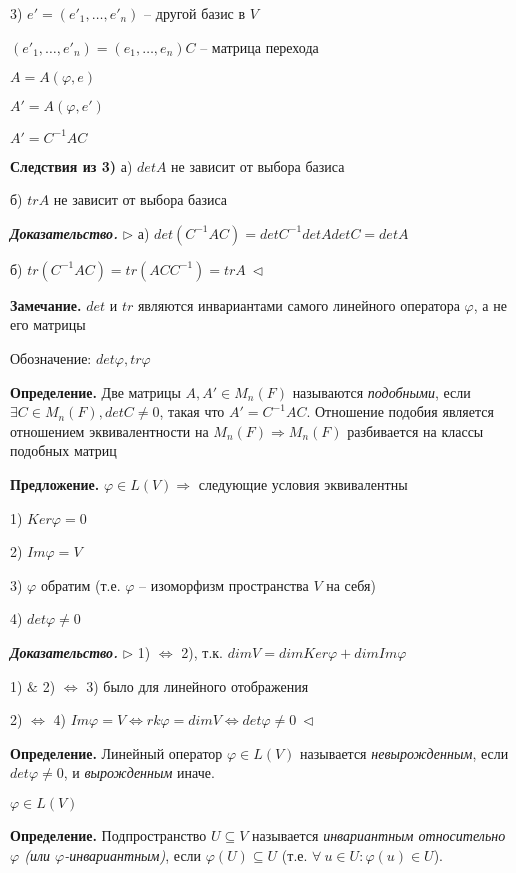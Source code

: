 3) $e' = (e'_1, \dots, e'_n)$ -- другой базис в $V$

$(e'_1, \dots, e'_n) = (e_1, \dots, e_n) C$ -- матрица перехода

$A = A(\varphi, e)$

$A' = A(\varphi, e')$

$A' = C^{-1}AC$

\bigskip
\textbf{Следствия из 3)} а) $det A$ не зависит от выбора базиса

б) $tr A$ не зависит от выбора базиса

\bigskip
\textbf{\textit{Доказательство.}} $\rhd$ а) $det (C^{-1} A C) = det C^{-1} det A det C = det A$

б) $tr(C^{-1} AC) = tr (AC C^{-1}) = tr A \ \lhd$

\bigskip
\textbf{Замечание.} $det$ и $tr$ являются инвариантами самого линейного оператора $\varphi$, а не его матрицы

Обозначение: $det \varphi, tr \varphi$

\bigskip
\textbf{Определение.} Две матрицы $A, A' \in M_n(F)$ называются \textit{подобными}, если $\exists C \in M_n(F), detC \neq 0$, такая что $A' = C^{-1} A C$. Отношение подобия является отношением эквивалентности на $M_n(F) \Rightarrow M_n(F)$ разбивается на классы подобных матриц

\bigskip
\textbf{Предложение.} $\varphi \in L(V) \Rightarrow$ следующие условия эквивалентны

1) $Ker \varphi = {0}$

2) $Im \varphi = V$

3) $\varphi$ обратим (т.е. $\varphi$ -- изоморфизм пространства $V$ на себя)

4) $det \varphi \neq 0$

\bigskip
\textbf{\textit{Доказательство.}} $\rhd$ 1) $\Leftrightarrow$ 2), т.к. $dim V = dim Ker \varphi + dim Im \varphi$

1) $\&$ 2) $\Leftrightarrow$ 3) было для линейного отображения

2) $\Leftrightarrow$ 4) $Im \varphi = V \Leftrightarrow rk \varphi = dim V \Leftrightarrow det \varphi \neq 0 \ \lhd$

\bigskip
\textbf{Определение.} Линейный оператор $\varphi \in L(V)$ называется \textit{невырожденным}, если $det \varphi \neq 0$, и \textit{вырожденным} иначе.

\bigskip
$\varphi \in L(V)$

\textbf{Определение.} Подпространство $U \subseteq V$ называется \textit{инвариантным относительно $\varphi$ (или $\varphi$-инвариантным)}, если $\varphi(U) \subseteq U$ (т.е. $\forall \ u \in U: \varphi(u) \in U$).

